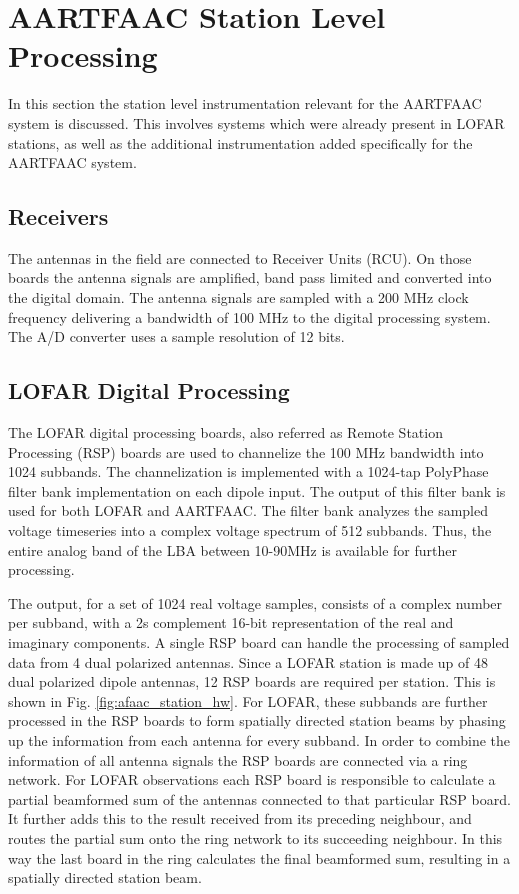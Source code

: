\documentclass{ws-jai}
\begin{document}
\section {\label{sec:station_hardware} AARTFAAC Station Level Processing}
In  this section  the station  level instrumentation  relevant for  the AARTFAAC
system is discussed.  This involves systems which were already  present in LOFAR
stations, as well  as the additional instrumentation added  specifically for the
AARTFAAC system.
\subsection {Receivers}  The  antennas  in the  field  are connected  to
Receiver Units  (RCU). On those boards  the antenna signals are  amplified, band
pass limited  and converted into  the digital  domain.  The antenna  signals are
sampled with a 200 MHz clock frequency  delivering a bandwidth of 100 MHz to the
digital processing  system. The  A/D converter  uses a  sample resolution  of 12
bits.

\subsection  {LOFAR Digital  Processing}  The  LOFAR digital  processing
boards, also  referred as  Remote Station  Processing (RSP)  boards are  used to
channelize  the 100  MHz bandwidth  into  1024 subbands.  The channelization  is
implemented with a 1024-tap PolyPhase  filter bank implementation on each dipole
input. The output of  this filter bank is used for both  LOFAR and AARTFAAC. The
filter  bank analyzes  the sampled  voltage  timeseries into  a complex  voltage
spectrum  of 512  subbands. Thus,  the  entire analog  band of  the LBA  between
10-90MHz is available for further processing.

The output, for a set of 1024 real voltage samples, consists of a complex number
per  subband,  with a  2s  complement  16-bit  representation  of the  real  and
imaginary components.  A  single RSP board can handle the  processing of sampled
data from 4 dual polarized antennas. Since a LOFAR station is made up of 48 dual
polarized dipole antennas, 12 RSP boards are required per station. This is shown
in  Fig.  \ref{fig:afaac_station_hw}.   For  LOFAR, these  subbands are  further
processed in the RSP boards to  form spatially directed station beams by phasing
up the information from each antenna for  every subband. In order to combine the
information  of all  antenna signals  the RSP  boards are  connected via  a ring
network. For  LOFAR observations each  RSP board  is responsible to  calculate a
partial  beamformed  sum  of  the  antennas connected  to  that  particular  RSP
board.  It  further  adds  this  to the  result  received  from  its  preceding
neighbour, and  routes the partial sum  onto the ring network  to its succeeding
neighbour.  In  this  way the  last  board  in  the  ring calculates  the  final
beamformed sum, resulting in a spatially directed station beam.
\end{document}
